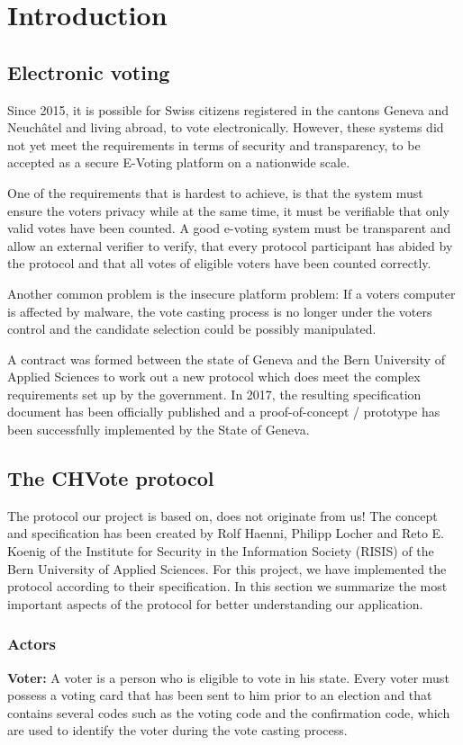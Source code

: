 \chapter{Introduction}
\section{Electronic voting}
Since 2015, it is possible for Swiss citizens registered in the cantons Geneva and Neuchâtel and living abroad, to vote electronically. However, these systems did not yet meet the requirements in terms of security and transparency, to be accepted as a secure E-Voting platform on a nationwide scale.

One of the requirements that is hardest to achieve, is that the system must ensure the voters privacy while at the same time, it must be verifiable that only valid votes have been counted. A good e-voting system must be transparent and allow an external verifier to verify, that every protocol participant has abided by the protocol and that all votes of eligible voters have been counted correctly.

Another common problem is the insecure platform problem: If a voters computer is affected by malware, the vote casting process is no longer under the voters control and the candidate selection could be possibly manipulated. 

A contract was formed between the state of Geneva and the Bern University of Applied Sciences to work out a new protocol which does meet the complex requirements set up by the government. In 2017, the resulting specification document has been officially published and a proof-of-concept / prototype has been successfully implemented by the State of Geneva. 

\section{The CHVote protocol}
The protocol our project is based on, does not originate from us! The concept and specification has been created by Rolf Haenni, Philipp Locher and Reto E. Koenig of the Institute for Security in the Information Society (RISIS) of the Bern University of Applied Sciences. For this project, we have implemented the protocol according to their specification. In this section we summarize the most important aspects of the protocol for better understanding our application.

\subsection{Actors}
\textbf{Voter: } A voter is a person who is eligible to vote in his state. Every voter must possess a voting card that has been sent to him prior to an election and that contains several codes such as the voting code and the confirmation code, which are used to identify the voter during the vote casting process.

